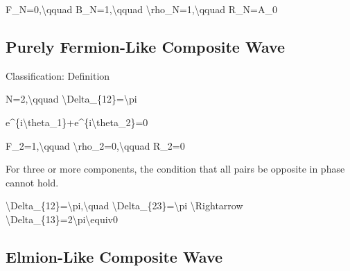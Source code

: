 \documentclass[
  a4paper]{article}
\newenvironment{Shaded}{}{}
\newcommand{\NormalTok}[1]{#1}
\begin{document}
\begin{Shaded}
\begin{Highlighting}[]
\NormalTok{F\_N=0,\textbackslash{}qquad B\_N=1,\textbackslash{}qquad \textbackslash{}rho\_N=1,\textbackslash{}qquad R\_N=A\_0}
\end{Highlighting}
\end{Shaded}

\subsection{Purely Fermion-Like Composite
Wave}\label{purely-fermion-like-composite-wave}

Classification: Definition

\begin{Shaded}
\begin{Highlighting}[]
\NormalTok{N=2,\textbackslash{}qquad \textbackslash{}Delta\_\{12\}=\textbackslash{}pi}
\end{Highlighting}
\end{Shaded}

\begin{Shaded}
\begin{Highlighting}[]
\NormalTok{e\^{}\{i\textbackslash{}theta\_1\}+e\^{}\{i\textbackslash{}theta\_2\}=0}
\end{Highlighting}
\end{Shaded}

\begin{Shaded}
\begin{Highlighting}[]
\NormalTok{F\_2=1,\textbackslash{}qquad \textbackslash{}rho\_2=0,\textbackslash{}qquad R\_2=0}
\end{Highlighting}
\end{Shaded}

For three or more components, the condition that all pairs be opposite
in phase cannot hold.

\begin{Shaded}
\begin{Highlighting}[]
\NormalTok{\textbackslash{}Delta\_\{12\}=\textbackslash{}pi,\textbackslash{}quad \textbackslash{}Delta\_\{23\}=\textbackslash{}pi}
\NormalTok{\textbackslash{}Rightarrow}
\NormalTok{\textbackslash{}Delta\_\{13\}=2\textbackslash{}pi\textbackslash{}equiv0}
\end{Highlighting}
\end{Shaded}

\subsection{Elmion-Like Composite
Wave}\label{elmion-like-composite-wave}
\end{document}
